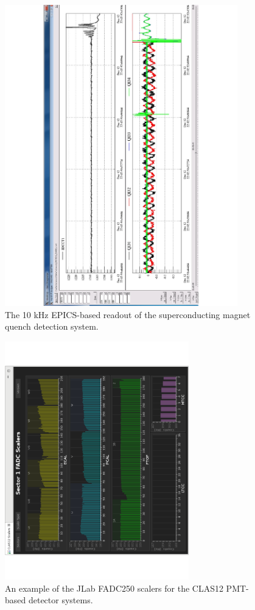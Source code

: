 \begin{figure}[t]\centering
	\includegraphics[width=0.9\textwidth]{img/tordaq}
	\caption{The 10 kHz EPICS-based readout of the superconducting magnet quench detection system.}
	\label{fig:tordaq}
\end{figure}

\begin{figure}[htbp]\centering
	\includegraphics[width=8cm]{img/fd-scalers}
	\caption{An example of the JLab FADC250 scalers for the CLAS12 PMT-based detector systems.}
	\label{fig:jlabscalers}
\end{figure}

